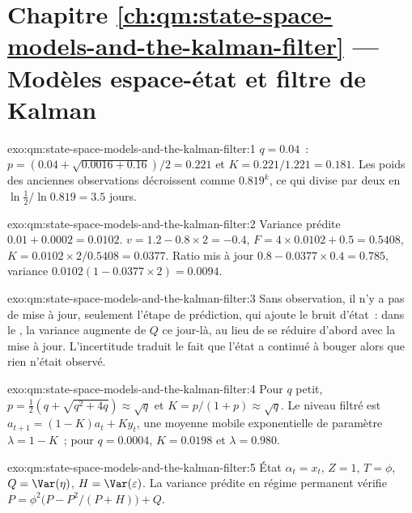 \section*{Chapitre \ref{ch:qm:state-space-models-and-the-kalman-filter} --- Modèles espace-état et filtre de Kalman}

\begin{solution}{exo:qm:state-space-models-and-the-kalman-filter:1}
$q = 0.04$~: $p = (0.04 + \sqrt{0.0016 + 0.16})/2 = 0.221$ et $K = 0.221/1.221 = 0.181$. Les poids des anciennes observations décroissent comme $0.819^k$, ce qui divise par deux en
$\ln\frac12/\ln0.819 = 3.5$ jours.
\end{solution}

\begin{solution}{exo:qm:state-space-models-and-the-kalman-filter:2}
Variance prédite $0.01 + 0.0002 = 0.0102$.  $v = 1.2 - 0.8 \times 2 = -0.4$, $F = 4 \times 0.0102 + 0.5 = 0.5408$,  $K = 0.0102 \times 2/0.5408 =
0.0377$. Ratio mis à jour $0.8 - 0.0377 \times 0.4 = 0.785$, variance $0.0102(1 - 0.0377 \times 2) = 0.0094$.
\end{solution}

\begin{solution}{exo:qm:state-space-models-and-the-kalman-filter:3}
Sans observation, il n'y a pas de mise à jour, seulement l'étape de prédiction, qui ajoute le bruit d'état~: dans le , la variance augmente de $Q$ ce jour-là,
au lieu de se réduire d'abord avec la mise à jour. L'incertitude traduit le fait que l'état a continué à bouger alors que rien n'était observé.
\end{solution}

\begin{solution}{exo:qm:state-space-models-and-the-kalman-filter:4}
Pour $q$ petit, $p = \frac12(q + \sqrt{q^2 + 4q}) \approx \sqrt q$ et $K = p/(1 + p) \approx \sqrt q$. Le niveau filtré est $a_{t+1} = (1 - K)a_t + Ky_t$, une moyenne mobile exponentielle de paramètre $\lambda
= 1 - K$~; pour $q = 0.0004$, $K = 0.0198$ et $\lambda = 0.980$.
\end{solution}

\begin{solution}{exo:qm:state-space-models-and-the-kalman-filter:5}
État $\alpha_t = x_t$, $Z = 1$, $T = \phi$, $Q = \Var(\eta)$, $H = \Var(\varepsilon)$. La variance prédite en régime permanent vérifie $P = \phi^2\bigl(P - P^2/(P + H)\bigr) + Q$.
\end{solution}

